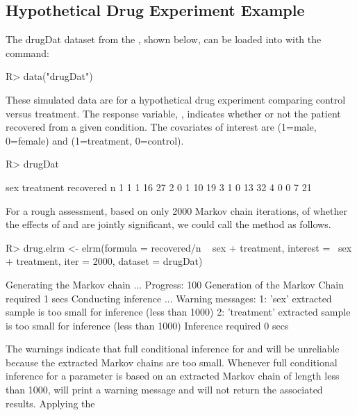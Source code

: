 \documentclass[article, shortnames]{jss}
\begin{document}
\subsection{Hypothetical Drug Experiment Example}
The drugDat dataset from the , shown below,
can be loaded into  with the
command:
\begin{CodeInput}
R> data("drugDat")
\end{CodeInput}
These simulated data are for a hypothetical drug experiment
comparing control versus treatment. The response variable,
, indicates whether or not the patient recovered
from a given condition. The covariates of interest are 
(1=male, 0=female) and  (1=treatment, 0=control).
\begin{CodeChunk}
\begin{CodeInput}
R> drugDat
\end{CodeInput}
\begin{CodeOutput}
  sex treatment recovered  n
1   1         1        16 27
2   0         1        10 19
3   1         0        13 32
4   0         0         7 21
\end{CodeOutput}
\end{CodeChunk}
For a rough assessment, based on only 2000 Markov chain
iterations, of whether the effects of  and
 are jointly significant, we could call the
 method as follows.
\begin{CodeChunk}
\begin{CodeInput}
R> drug.elrm <- elrm(formula = recovered/n ~ sex + treatment,
interest = ~sex + treatment, iter = 2000, dataset = drugDat)
\end{CodeInput}
\begin{CodeOutput}
Generating the Markov chain ...
Progress: 100%
Generation of the Markov Chain required 1 secs
Conducting inference ...
Warning messages:
1: 'sex' extracted sample is too small for inference (less than 1000)
2: 'treatment' extracted sample is too small for inference (less than 1000)
Inference required 0 secs
\end{CodeOutput}
\end{CodeChunk}
The warnings indicate that full conditional inference for
 and  will be unreliable because the
extracted Markov chains are too small. Whenever full conditional
inference for a parameter is based on an extracted Markov chain of
length less than 1000,  will print a warning message and
will not return the associated results. Applying the
\end{document}
